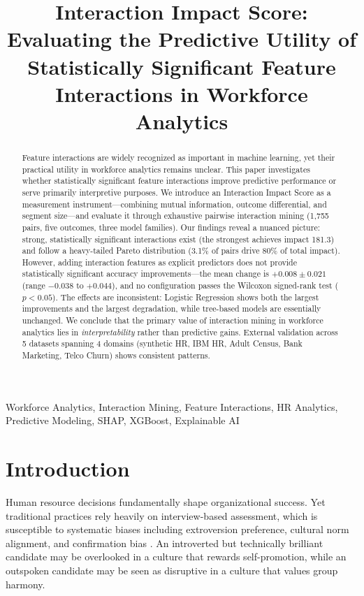 \documentclass[conference]{IEEEtran}
\title{Interaction Impact Score: Evaluating the Predictive Utility of Statistically Significant Feature Interactions in Workforce Analytics}
\author{
    \IEEEauthorblockN{Nayan Dhurve}
    \IEEEauthorblockA{
        Independent Researcher\\
        Nagpur, Maharashtra, India\\
        \texttt{nayankdhurve@gmail.com}\\
        ORCID: 0009-0005-8051-4988
    }
}
\begin{document}
\maketitle

\begin{abstract}
Feature interactions are widely recognized as important in machine learning, yet their practical utility in workforce analytics remains unclear. This paper investigates whether statistically significant feature interactions improve predictive performance or serve primarily interpretive purposes. We introduce an Interaction Impact Score as a measurement instrument---combining mutual information, outcome differential, and segment size---and evaluate it through exhaustive pairwise interaction mining (1,755 pairs, five outcomes, three model families). Our findings reveal a nuanced picture: strong, statistically significant interactions exist (the strongest achieves impact 181.3) and follow a heavy-tailed Pareto distribution (3.1\% of pairs drive 80\% of total impact). However, adding interaction features as explicit predictors does not provide statistically significant accuracy improvements---the mean change is $+0.008\pm0.021$ (range $-0.038$ to $+0.044$), and no configuration passes the Wilcoxon signed-rank test ($p < 0.05$). The effects are inconsistent: Logistic Regression shows both the largest improvements and the largest degradation, while tree-based models are essentially unchanged. We conclude that the primary value of interaction mining in workforce analytics lies in \textit{interpretability} rather than predictive gains. External validation across 5 datasets spanning 4 domains (synthetic HR, IBM HR, Adult Census, Bank Marketing, Telco Churn) shows consistent patterns.
\end{abstract}

\begin{IEEEkeywords}
Workforce Analytics, Interaction Mining, Feature Interactions, HR Analytics, Predictive Modeling, SHAP, XGBoost, Explainable AI
\end{IEEEkeywords}

\section{Introduction}
\label{sec:introduction}

Human resource decisions fundamentally shape organizational success. Yet traditional practices rely heavily on interview-based assessment, which is susceptible to systematic biases including extroversion preference, cultural norm alignment, and confirmation bias \cite{fabris2025fairness}. An introverted but technically brilliant candidate may be overlooked in a culture that rewards self-promotion, while an outspoken candidate may be seen as disruptive in a culture that values group harmony.
\end{document}
